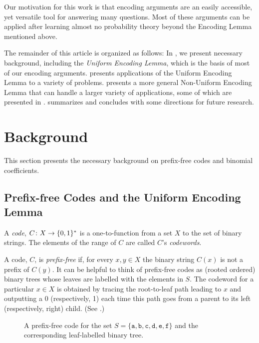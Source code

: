 \documentclass[lotsofwhite]{patmorin}
\begin{document}
Our motivation for this work is that encoding arguments are an easily
accessible, yet versatile tool for answering many questions.  Most of
these arguments can be applied after learning almost no probability
theory beyond the Encoding Lemma mentioned above.

The remainder of this article is organized as follows: In ,
we present necessary background, including the \emph{Uniform
Encoding Lemma}, which is the basis of most of our encoding arguments.
 presents  applications of the Uniform Encoding
Lemma to a variety of problems.   presents a more
general Non-Uniform Encoding Lemma that can handle a larger variety of
applications, some of which are presented in .
 summarizes and concludes with some directions for
future research.



\section{Background}

This section presents the necessary background on prefix-free codes and binomial coefficients.

\subsection{Prefix-free Codes and the Uniform Encoding Lemma}

A \emph{code}, $C\colon X\to \{0,1\}^*$ is a one-to-function from a set
$X$ to the set of binary strings.  The elements of the range of $C$ are
called $C$'s \emph{codewords}.

A code, $C$, is \emph{prefix-free} if, for every $x,y\in X$ the binary
string $C(x)$ is not a prefix of $C(y)$.  It can be helpful to think
of prefix-free codes as (rooted ordered) binary trees whose leaves
are labelled with the elements in $S$.  The codeword for a particular
$x\in X$ is obtained by tracing the root-to-leaf path leading to $x$
and outputting a 0 (respectively, 1) each time this path goes from a
parent to its left (respectively, right) child. (See .)

\begin{figure}
  \caption{A prefix-free code for the set
    $S=\{\mathtt{a},\mathtt{b},\mathtt{c},\mathtt{d},\mathtt{e},\mathtt{f}\}$
    and the corresponding leaf-labelled binary tree.}
\end{figure}
\end{document}
